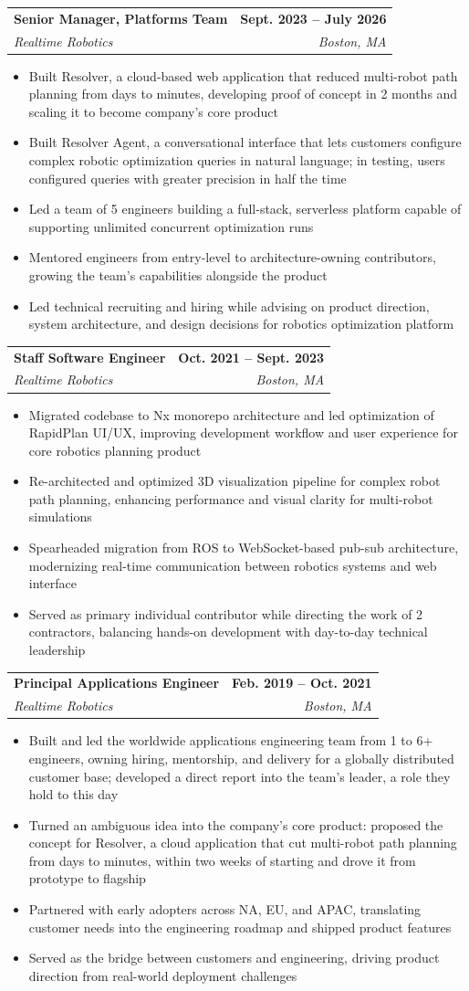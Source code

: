 \documentclass[letterpaper,11pt]{article}
\makeatletter
\newcommand{\resumeItem}[1]{
  \item\small{
    {#1 \vspace{-2pt}}
  }
}
\newcommand{\resumeSubheading}[4]{
  \vspace{-2pt}\item
    \begin{tabular*}{1.0\textwidth}[t]{l@{\extracolsep{\fill}}r}
      \textbf{#1} & \textbf{\small #2} \\
      \textit{\small#3} & \textit{\small #4} \\
    \end{tabular*}\vspace{-7pt}
}
\newcommand{\resumeItemListStart}{\begin{itemize}}
\newcommand{\resumeItemListEnd}{\end{itemize}\vspace{-5pt}}
\makeatother
\begin{document}
    \resumeSubheading
      {Senior Manager, Platforms Team}{Sept. 2023 -- July 2026}
      {Realtime Robotics}{Boston, MA}
      \resumeItemListStart
        \resumeItem{Built Resolver, a cloud-based web application that reduced multi-robot path planning from days to minutes, developing proof of concept in 2 months and scaling it to become company's core product}
        \resumeItem{Built Resolver Agent, a conversational interface that lets customers configure complex robotic optimization queries in natural language; in testing, users configured queries with greater precision in half the time}
        \resumeItem{Led a team of 5 engineers building a full-stack, serverless platform capable of supporting unlimited concurrent optimization runs}
        \resumeItem{Mentored engineers from entry-level to architecture-owning contributors, growing the team's capabilities alongside the product}
        \resumeItem{Led technical recruiting and hiring while advising on product direction, system architecture, and design decisions for robotics optimization platform}
      \resumeItemListEnd

    \resumeSubheading
      {Staff Software Engineer}{Oct. 2021 -- Sept. 2023}
      {Realtime Robotics}{Boston, MA}
      \resumeItemListStart
        \resumeItem{Migrated codebase to Nx monorepo architecture and led optimization of RapidPlan UI/UX, improving development workflow and user experience for core robotics planning product}
        \resumeItem{Re-architected and optimized 3D visualization pipeline for complex robot path planning, enhancing performance and visual clarity for multi-robot simulations}
        \resumeItem{Spearheaded migration from ROS to WebSocket-based pub-sub architecture, modernizing real-time communication between robotics systems and web interface}
        \resumeItem{Served as primary individual contributor while directing the work of 2 contractors, balancing hands-on development with day-to-day technical leadership}
    \resumeItemListEnd

    \resumeSubheading
      {Principal Applications Engineer}{Feb. 2019 -- Oct. 2021}
      {Realtime Robotics}{Boston, MA}
      \resumeItemListStart
        \resumeItem{Built and led the worldwide applications engineering team from 1 to 6+ engineers, owning hiring, mentorship, and delivery for a globally distributed customer base; developed a direct report into the team's leader, a role they hold to this day}
        \resumeItem{Turned an ambiguous idea into the company's core product: proposed the concept for Resolver, a cloud application that cut multi-robot path planning from days to minutes, within two weeks of starting and drove it from prototype to flagship}
        \resumeItem{Partnered with early adopters across NA, EU, and APAC, translating customer needs into the engineering roadmap and shipped product features}
        \resumeItem{Served as the bridge between customers and engineering, driving product direction from real-world deployment challenges}
    \resumeItemListEnd
\end{document}
